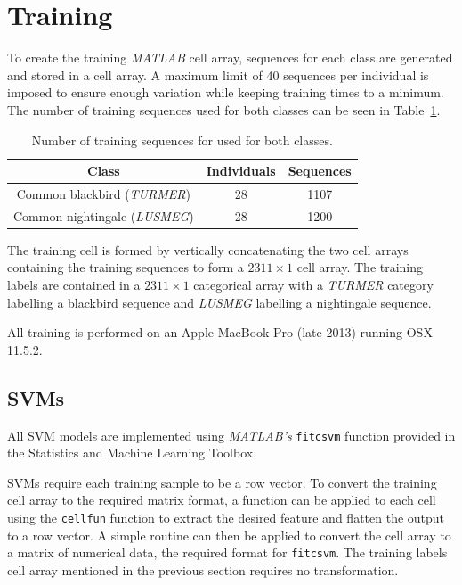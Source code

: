 \section{Training}\label{sec:training}

To create the training \textit{MATLAB} cell array, sequences for each class are
generated and stored in a cell array. A maximum limit of 40 sequences per
individual is imposed to ensure enough variation while keeping training times to
a minimum. The number of training sequences used for both classes can be seen in
Table~\ref{table:training_samples}.

\begin{table}[h!t]
\begin{center}
\begin{tabular}{c c c}
\toprule
Class & Individuals & Sequences \\ [0.5ex]
\midrule
Common blackbird (\textit{TURMER}) & 28 & 1107 \\
Common nightingale (\textit{LUSMEG}) & 28 & 1200 \\
\bottomrule
\end{tabular}
\caption{Number of training sequences for used for both
classes.}\label{table:training_samples}
\end{center}
\end{table}

The training cell is formed by vertically concatenating the two cell arrays
containing the training sequences to form a $2311 \times 1$ cell array. The
training labels are contained in a $2311 \times 1$ categorical array with a
\textit{TURMER} category labelling a blackbird sequence and \textit{LUSMEG}
labelling a nightingale sequence.

All training is performed on an Apple MacBook Pro (late 2013) running OSX
11.5.2.

\subsection{SVMs}

All SVM models are implemented using \textit{MATLAB's} \texttt{fitcsvm}
function provided in the Statistics and Machine Learning Toolbox.

SVMs require each training sample to be a row vector. To convert the training
cell array to the required matrix format, a function can be applied to each cell
using the \texttt{cellfun} function to extract the desired feature and flatten
the output to a row vector. A simple routine can then be applied to convert the
cell array to a matrix of numerical data, the required format for
\texttt{fitcsvm}. The training labels cell array mentioned in the previous
section requires no transformation.

